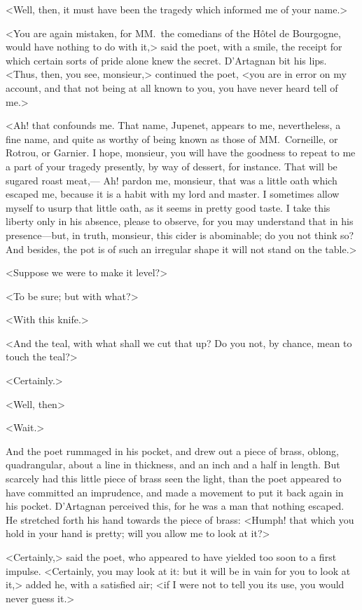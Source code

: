 <Well, then, it must have been the tragedy which informed me of your name.>

<You are again mistaken, for MM.~the comedians of the Hôtel de Bourgogne, would have nothing to do with it,> said the poet, with a smile, the receipt for which certain sorts of pride alone knew the secret. D'Artagnan bit his lips. <Thus, then, you see, monsieur,> continued the poet, <you are in error on my account, and that not being at all known to you, you have never heard tell of me.>

<Ah! that confounds me. That name, Jupenet, appears to me, nevertheless, a fine name, and quite as worthy of being known as those of MM.~Corneille, or Rotrou, or Garnier. I hope, monsieur, you will have the goodness to repeat to me a part of your tragedy presently, by way of dessert, for instance. That will be sugared roast meat,— Ah! pardon me, monsieur, that was a little oath which escaped me, because it is a habit with my lord and master. I sometimes allow myself to usurp that little oath, as it seems in pretty good taste. I take this liberty only in his absence, please to observe, for you may understand that in his presence—but, in truth, monsieur, this cider is abominable; do you not think so? And besides, the pot is of such an irregular shape it will not stand on the table.>

<Suppose we were to make it level?>

<To be sure; but with what?>

<With this knife.>

<And the teal, with what shall we cut that up? Do you not, by chance, mean to touch the teal?>

<Certainly.>

<Well, then\longdash>

<Wait.>

And the poet rummaged in his pocket, and drew out a piece of brass, oblong, quadrangular, about a line in thickness, and an inch and a half in length. But scarcely had this little piece of brass seen the light, than the poet appeared to have committed an imprudence, and made a movement to put it back again in his pocket. D'Artagnan perceived this, for he was a man that nothing escaped. He stretched forth his hand towards the piece of brass: <Humph! that which you hold in your hand is pretty; will you allow me to look at it?>

<Certainly,> said the poet, who appeared to have yielded too soon to a first impulse. <Certainly, you may look at it: but it will be in vain for you to look at it,> added he, with a satisfied air; <if I were not to tell you its use, you would never guess it.>

